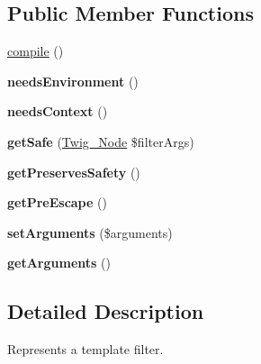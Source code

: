 \subsection*{Public Member Functions}
\begin{DoxyCompactItemize}
\item 
\hyperlink{interface_twig___filter_interface_a3815e7c2e73f00c2ebffcf5b90eef3b1}{compile} ()
\item 
\hypertarget{interface_twig___filter_interface_a711311882c7dd1058f92f7eb0e8edeeb}{}{\bfseries needs\+Environment} ()\label{interface_twig___filter_interface_a711311882c7dd1058f92f7eb0e8edeeb}

\item 
\hypertarget{interface_twig___filter_interface_a52c35bc6da8861f40aa59f1b99f7ef0f}{}{\bfseries needs\+Context} ()\label{interface_twig___filter_interface_a52c35bc6da8861f40aa59f1b99f7ef0f}

\item 
\hypertarget{interface_twig___filter_interface_acc5701ec146ba15919020bbc42941632}{}{\bfseries get\+Safe} (\hyperlink{class_twig___node}{Twig\+\_\+\+Node} \$filter\+Args)\label{interface_twig___filter_interface_acc5701ec146ba15919020bbc42941632}

\item 
\hypertarget{interface_twig___filter_interface_a7fc1becef9ade703f0c381e579d5a879}{}{\bfseries get\+Preserves\+Safety} ()\label{interface_twig___filter_interface_a7fc1becef9ade703f0c381e579d5a879}

\item 
\hypertarget{interface_twig___filter_interface_a4b7863ed7e994206f25a6c84cbc59116}{}{\bfseries get\+Pre\+Escape} ()\label{interface_twig___filter_interface_a4b7863ed7e994206f25a6c84cbc59116}

\item 
\hypertarget{interface_twig___filter_interface_a2b7df0e0f61ee886144db2d59fc0d7da}{}{\bfseries set\+Arguments} (\$arguments)\label{interface_twig___filter_interface_a2b7df0e0f61ee886144db2d59fc0d7da}

\item 
\hypertarget{interface_twig___filter_interface_a1d4c324c5a088be98d99d3efbf3502e1}{}{\bfseries get\+Arguments} ()\label{interface_twig___filter_interface_a1d4c324c5a088be98d99d3efbf3502e1}

\end{DoxyCompactItemize}


\subsection{Detailed Description}
Represents a template filter.

